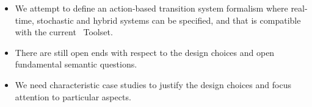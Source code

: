 \begin{slide}
\begin{itemize}
\item We attempt to define an action-based transition system formalism 
where real-time, stochastic and hybrid systems can be specified,
and that is compatible with the current \mcrl\ Toolset.
\pause
\item There are still open ends with respect to the design choices 
and open fundamental semantic questions.
\pause
\item We need characteristic case studies to justify the design choices 
and focus attention to particular aspects.
\end{itemize}


\end{slide}

